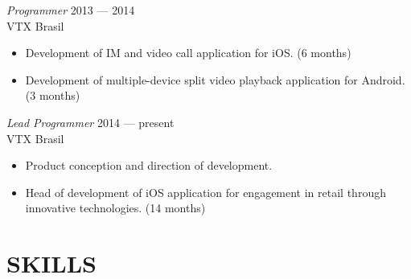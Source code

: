 \documentclass[]{res} %
\newcommand{\sbt}{\,\begin{picture}(-1,1)(-2,-3)\circle*{2}\end{picture}\ }
\def \divspace{6pt}
\def \myitemback{0.55cm}
\def \myitemsep{0pt}
\def \mypositionface{\sl}
\def \myorgface{\sc}
\begin{document}
\begin{resume}

{\mypositionface Programmer} \hfill 2013 — 2014 \\
{\myorgface VTX Brasil}

\begin{itemize}[itemsep=\myitemsep,leftmargin=\myitemback]
\item[\sbt] Development of IM and video call application for iOS. (6 months)
\item[\sbt] Development of multiple-device split video playback application for Android. (3 months)
\end{itemize}

{\mypositionface Lead Programmer} \hfill 2014 — present \\
{\myorgface VTX Brasil}

\begin{itemize}[itemsep=\myitemsep,leftmargin=\myitemback]
\item[\sbt] Product conception and direction of development.
\item[\sbt] Head of development of iOS application for engagement in retail through innovative technologies. (14 months)
\end{itemize}

\section{SKILLS \hspace{\divspace} }


\end{resume}
\end{document}
